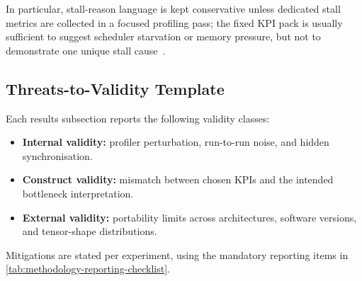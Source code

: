 In particular, stall-reason language is kept conservative unless dedicated
stall metrics are collected in a focused profiling pass; the fixed KPI pack is
usually sufficient to suggest scheduler starvation or memory pressure, but not
to demonstrate one unique stall cause~\cite{nvidia-nsight-compute-profiling-guide}.

\subsection{Threats-to-Validity Template}

Each results subsection reports the following validity classes:
\begin{itemize}
  \item \textbf{Internal validity:} profiler perturbation, run-to-run noise,
  and hidden synchronisation.
  \item \textbf{Construct validity:} mismatch between chosen KPIs and the
  intended bottleneck interpretation.
  \item \textbf{External validity:} portability limits across architectures,
  software versions, and tensor-shape distributions.
\end{itemize}

Mitigations are stated per experiment, using the mandatory reporting items in
\cref{tab:methodology-reporting-checklist}.
